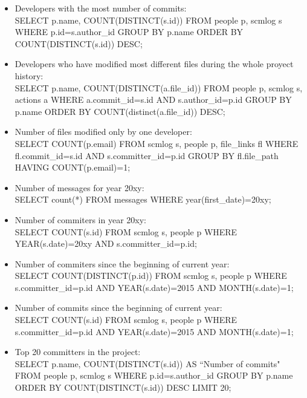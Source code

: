 \documentclass[a4paper, 12pt]{book}
\begin{document}
\begin{itemize}
	\item Developers with the most number of commits:\\
	SELECT p.name, COUNT(DISTINCT(s.id)) FROM people p, scmlog s WHERE p.id=s.author\_id GROUP BY p.name ORDER BY COUNT(DISTINCT(s.id)) DESC;
	
	\item Developers who have modified most different files during the whole proyect history:\\
	SELECT p.name, COUNT(DISTINCT(a.file\_id)) FROM people p, scmlog s, actions a WHERE a.commit\_id=s.id AND s.author\_id=p.id GROUP BY p.name ORDER BY COUNT(distinct(a.file\_id)) DESC;
	
	\item Number of files modified only by one developer:\\
	SELECT COUNT(p.email) FROM scmlog s, people p, file\_links fl WHERE fl.commit\_id=s.id AND s.committer\_id=p.id GROUP BY fl.file\_path HAVING COUNT(p.email)=1;
	
	\item Number of messages for year 20xy:\\
	SELECT count(*) FROM messages WHERE year(first\_date)=20xy;
	
	\item Number of commiters in year 20xy:\\
	SELECT COUNT(s.id) FROM scmlog s, people p WHERE YEAR(s.date)=20xy AND s.committer\_id=p.id;
	
	\item Number of commiters since the beginning of current year:\\
	SELECT COUNT(DISTINCT(p.id)) FROM scmlog s, people p WHERE s.committer\_id=p.id AND YEAR(s.date)=2015 AND MONTH(s.date)=1;
	
	\item Number of commits since the beginning of current year:\\
	SELECT COUNT(s.id) FROM scmlog s, people p WHERE s.committer\_id=p.id AND YEAR(s.date)=2015 AND MONTH(s.date)=1;
	
	\item Top 20 committers in the project:\\
	SELECT p.name, COUNT(DISTINCT(s.id)) AS ``Number of commits" FROM people p, scmlog s WHERE p.id=s.author\_id GROUP BY p.name ORDER BY COUNT(DISTINCT(s.id)) DESC LIMIT 20;
	
\end{itemize}
\end{document}
